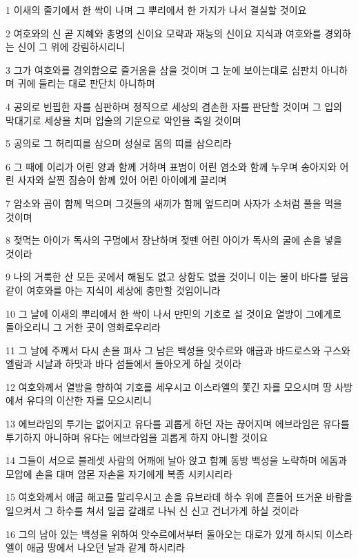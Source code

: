 \par 1 이새의 줄기에서 한 싹이 나며 그 뿌리에서 한 가지가 나서 결실할 것이요
\par 2 여호와의 신 곧 지혜와 총명의 신이요 모략과 재능의 신이요 지식과 여호와를 경외하는 신이 그 위에 강림하시리니
\par 3 그가 여호와를 경외함으로 즐거움을 삼을 것이며 그 눈에 보이는대로 심판치 아니하며 귀에 들리는 대로 판단치 아니하며
\par 4 공의로 빈핍한 자를 심판하며 정직으로 세상의 겸손한 자를 판단할 것이며 그 입의 막대기로 세상을 치며 입술의 기운으로 악인을 죽일 것이며
\par 5 공의로 그 허리띠를 삼으며 성실로 몸의 띠를 삼으리라
\par 6 그 때에 이리가 어린 양과 함께 거하며 표범이 어린 염소와 함께 누우며 송아지와 어린 사자와 살찐 짐승이 함께 있어 어린 아이에게 끌리며
\par 7 암소와 곰이 함께 먹으며 그것들의 새끼가 함께 엎드리며 사자가 소처럼 풀을 먹을 것이며
\par 8 젖먹는 아이가 독사의 구멍에서 장난하며 젖뗀 어린 아이가 독사의 굴에 손을 넣을 것이라
\par 9 나의 거룩한 산 모든 곳에서 해됨도 없고 상함도 없을 것이니 이는 물이 바다를 덮음 같이 여호와를 아는 지식이 세상에 충만할 것임이니라
\par 10 그 날에 이새의 뿌리에서 한 싹이 나서 만민의 기호로 설 것이요 열방이 그에게로 돌아오리니 그 거한 곳이 영화로우리라
\par 11 그 날에 주께서 다시 손을 펴사 그 남은 백성을 앗수르와 애굽과 바드로스와 구스와 엘람과 시날과 하맛과 바다 섬들에서 돌아오게 하실 것이라
\par 12 여호와께서 열방을 향하여 기호를 세우시고 이스라엘의 쫓긴 자를 모으시며 땅 사방에서 유다의 이산한 자를 모으시리니
\par 13 에브라임의 투기는 없어지고 유다를 괴롭게 하던 자는 끊어지며 에브라임은 유다를 투기하지 아니하며 유다는 에브라임을 괴롭게 하지 아니할 것이요
\par 14 그들이 서으로 블레셋 사람의 어깨에 날아 앉고 함께 동방 백성을 노략하며 에돔과 모압에 손을 대며 암몬 자손을 자기에게 복종 시키시리라
\par 15 여호와께서 애굽 해고를 말리우시고 손을 유브라데 하수 위에 흔들어 뜨거운 바람을 일으켜서 그 하수를 쳐서 일곱 갈래로 나눠 신 신고 건너가게 하실 것이라
\par 16 그의 남아 있는 백성을 위하여 앗수르에서부터 돌아오는 대로가 있게 하시되 이스라엘이 애굽 땅에서 나오던 날과 같게 하시리라


